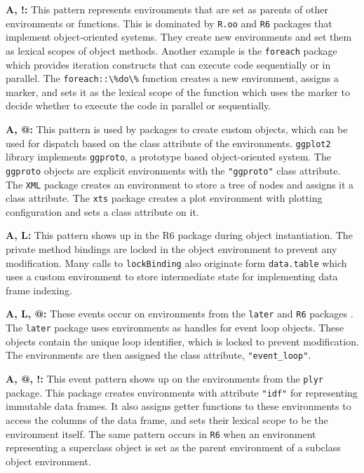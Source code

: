 \documentclass[10pt,review,sigplan,authorversion=true]{acmart}
\newcommand{\code}[1]{\lstinline |#1|\xspace}
\begin{document}
\noindent
\textbf{A, !:} This pattern represents environments that are set as parents of
other environments or functions. This is dominated by \code{R.oo} and \code{R6}
packages that implement object-oriented systems. They create new environments
and set them as lexical scopes of object methods. Another example is the
\code{foreach} package which provides iteration constructs that can execute code
sequentially or in parallel. The \code{foreach::\%do\%} function creates a new
environment, assigns a marker, and sets it as the lexical scope of the function
which uses the marker to decide whether to execute the code in parallel or
sequentially.

\noindent
\textbf{A, @:} This pattern is used by packages to create custom objects, which
can be used for dispatch based on the class attribute of the environments.
\code{ggplot2} library implements \code{ggproto}, a prototype based
object-oriented system. The \code{ggproto} objects are explicit environments
with the \code{"ggproto"} class attribute. The \code{XML} package creates an
environment to store a tree of nodes and assigns it a class attribute. The
\code{xts} package creates a plot environment with plotting configuration and
sets a class attribute on it.

\noindent
\textbf{A, L:} This pattern shows up in the R6 package during object
instantiation. The private method bindings are locked in the object environment
to prevent any modification. Many calls to \code{lockBinding} also originate
form \code{data.table} which uses a custom environment to store intermediate
state for implementing data frame indexing.

\noindent
\textbf{A, L, @:} These events occur on environments from the \code{later} and
\code{R6} packages . The \code{later} package uses environments as handles for
event loop objects. These objects contain the unique loop identifier, which is
locked to prevent modification. The environments are then assigned the class
attribute, \code{"event_loop"}.

\noindent
\textbf{A, @, !:} This event pattern shows up on the environments from the
\code{plyr} package. This package creates environments with attribute
\code{"idf"} for representing immutable data frames. It also assigns getter
functions to these environments to access the columns of the data frame, and
sets their lexical scope to be the environment itself. The same pattern occurs
in \code{R6} when an environment representing a superclass object is set as the
parent environment of a subclass object environment.
\end{document}
